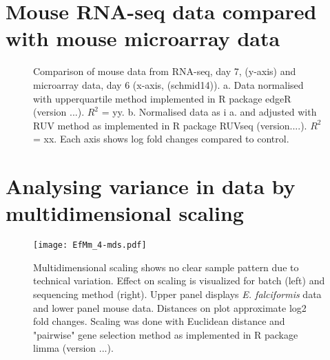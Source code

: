\documentclass{article}
\begin{document}
\section{Mouse RNA-seq data compared with mouse microarray data}
\begin{figure}[H]
\begin{center}
\caption{Comparison of mouse data from RNA-seq, day 7, (y-axis) and microarray data, day 6 (x-axis, (schmid14)). 
	a. Data normalised with upperquartile method implemented in R package edgeR (version ...). $R^2$ = yy. 
	b. Normalised data as i a. and adjusted with RUV method as implemented in R package RUVseq (version....). 
	$R^2$ = xx. Each axis shows log fold changes compared to control.}
\end{center}
\end{figure}

\section{Analysing variance in data by multidimensional scaling}
\begin{figure}[H]
\begin{center}
	\texttt{[image: EfMm\_4-mds.pdf]} %
	\caption{Multidimensional scaling shows no clear sample pattern due to technical variation. Effect on scaling is visualized 
	for batch (left) and sequencing method (right). Upper panel displays \textit{E. falciformis} data and lower panel mouse data. 
	Distances on plot approximate log2 fold changes. Scaling was done with Euclidean distance and "pairwise" gene selection 
	method as implemented in R package limma (version ...).}
\end{center}
\end{figure}

\clearpage
\end{document}
